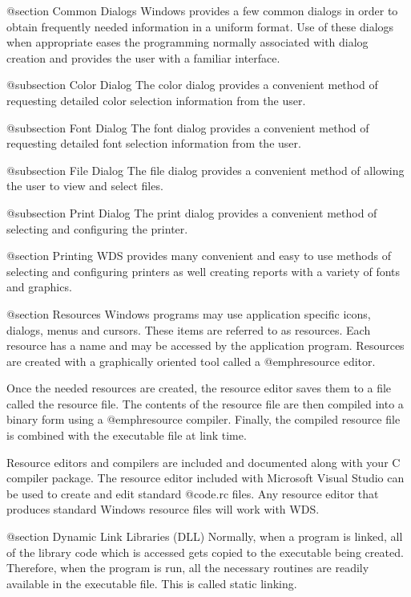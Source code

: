 @section Common Dialogs
Windows provides a few common dialogs in order to obtain frequently
needed information in a uniform format.  Use of these dialogs when
appropriate eases the programming normally associated with dialog
creation and provides the user with a familiar interface.

@subsection Color Dialog
The color dialog provides a convenient method of requesting detailed
color selection information from the user.

@subsection Font Dialog
The font dialog provides a convenient method of requesting detailed
font selection information from the user.

@subsection File Dialog
The file dialog provides a convenient method of allowing the user to
view and select files.

@subsection Print Dialog
The print dialog provides a convenient method of selecting and configuring
the printer.

@section Printing
WDS provides many convenient and easy to use methods of selecting and
configuring printers as well creating reports with a variety of fonts
and graphics.


@section Resources
Windows programs may use application specific icons, dialogs, menus and
cursors.  These items are referred to as resources.  Each resource has a
name and may be accessed by the application program.  Resources are
created with a graphically oriented tool called a @emph{resource editor}.

Once the needed resources are created, the resource editor saves them to
a file called the resource file.  The contents of the resource file are
then compiled into a binary form using a @emph{resource compiler}.
Finally, the compiled resource file is combined with the executable file
at link time.

Resource editors and compilers are included and documented along with
your C compiler package.  The resource editor included with
Microsoft Visual Studio can be used to create and edit standard
@code{.rc} files.  Any resource editor that produces standard Windows
resource files will work with WDS.



@section Dynamic Link Libraries (DLL)
Normally, when a program is linked, all of the library code which is
accessed gets copied to the executable being created.  Therefore, when
the program is run, all the necessary routines are readily available in
the executable file.  This is called static linking.

